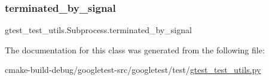 \subsubsection{\texorpdfstring{terminated\_by\_signal}{terminated\_by\_signal}}
{\footnotesize\ttfamily gtest\+\_\+test\+\_\+utils.\+Subprocess.\+terminated\+\_\+by\+\_\+signal}



The documentation for this class was generated from the following file\+:\begin{DoxyCompactItemize}
\item 
cmake-\/build-\/debug/googletest-\/src/googletest/test/\mbox{\hyperlink{gtest__test__utils_8py}{gtest\+\_\+test\+\_\+utils.\+py}}\end{DoxyCompactItemize}
